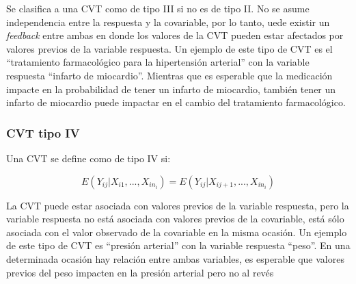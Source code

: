 \documentclass[12pt]{article}
\begin{document}
Se clasifica a una CVT como de tipo III si no es de tipo II. No se asume independencia entre la respuesta y la covariable,
por lo tanto, uede existir un \emph{feedback} entre ambas en donde los valores de la CVT pueden estar afectados por
valores previos de la variable respuesta. Un ejemplo de este tipo de CVT es el ``tratamiento farmacológico para la
hipertensión arterial'' con la variable respuesta ``infarto de miocardio''. Mientras que es esperable que la medicación
impacte en la probabilidad de tener un infarto de miocardio, también tener un infarto de miocardio puede impactar
en el cambio del tratamiento farmacológico.

\subsubsection{CVT tipo IV}

Una CVT se define como de tipo IV si:

\begin{equation}
	\label{CVT tipo IV}
	E(Y_{ij}|X_{i1}, ..., X_{in_i}) = E(Y_{ij}|X_{ij+1}, ..., X_{in_i})
\end{equation}

La CVT puede estar asociada con valores previos de la variable respuesta, pero la variable respuesta no está asociada
con valores previos de la covariable, está sólo asociada con el valor observado de la covariable en la misma ocasión.
Un ejemplo de este tipo de CVT es ``presión arterial'' con la variable respuesta ``peso''. En una determinada ocasión hay
relación entre ambas variables, es esperable que valores previos del peso impacten en la presión arterial pero no al revés
\end{document}
